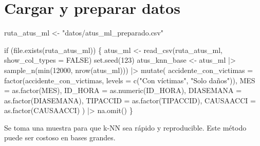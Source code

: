 \documentclass[
  spanish,
  11pt,
  letterpaper,
]{book}
\newenvironment{Shaded}{}{}
\newcommand{\AttributeTok}[1]{\textcolor[rgb]{0.84,0.23,0.29}{#1}}
\newcommand{\ConstantTok}[1]{\textcolor[rgb]{0.00,0.36,0.77}{#1}}
\newcommand{\ControlFlowTok}[1]{\textcolor[rgb]{0.84,0.23,0.29}{#1}}
\newcommand{\DecValTok}[1]{\textcolor[rgb]{0.00,0.36,0.77}{#1}}
\newcommand{\FunctionTok}[1]{\textcolor[rgb]{0.44,0.26,0.76}{#1}}
\newcommand{\NormalTok}[1]{\textcolor[rgb]{0.14,0.16,0.18}{#1}}
\newcommand{\OtherTok}[1]{\textcolor[rgb]{0.44,0.26,0.76}{#1}}
\newcommand{\SpecialCharTok}[1]{\textcolor[rgb]{0.00,0.36,0.77}{#1}}
\newcommand{\StringTok}[1]{\textcolor[rgb]{0.01,0.18,0.38}{#1}}
\begin{document}
\section{Cargar y preparar datos}\label{cargar-y-preparar-datos}

\begin{Shaded}
\begin{Highlighting}[]
\NormalTok{ruta\_atus\_ml }\OtherTok{\textless{}{-}} \StringTok{"datos/atus\_ml\_preparado.csv"}

\ControlFlowTok{if}\NormalTok{ (}\FunctionTok{file.exists}\NormalTok{(ruta\_atus\_ml)) \{}
\NormalTok{  atus\_ml }\OtherTok{\textless{}{-}} \FunctionTok{read\_csv}\NormalTok{(ruta\_atus\_ml, }\AttributeTok{show\_col\_types =} \ConstantTok{FALSE}\NormalTok{)}
  \FunctionTok{set.seed}\NormalTok{(}\DecValTok{123}\NormalTok{)}
\NormalTok{  atus\_knn\_base }\OtherTok{\textless{}{-}}\NormalTok{ atus\_ml }\SpecialCharTok{|\textgreater{}}
    \FunctionTok{sample\_n}\NormalTok{(}\FunctionTok{min}\NormalTok{(}\DecValTok{12000}\NormalTok{, }\FunctionTok{nrow}\NormalTok{(atus\_ml))) }\SpecialCharTok{|\textgreater{}}
    \FunctionTok{mutate}\NormalTok{(}
      \AttributeTok{accidente\_con\_victimas =} \FunctionTok{factor}\NormalTok{(accidente\_con\_victimas, }\AttributeTok{levels =} \FunctionTok{c}\NormalTok{(}\StringTok{"Con víctimas"}\NormalTok{, }\StringTok{"Solo daños"}\NormalTok{)),}
      \AttributeTok{MES =} \FunctionTok{as.factor}\NormalTok{(MES),}
      \AttributeTok{ID\_HORA =} \FunctionTok{as.numeric}\NormalTok{(ID\_HORA),}
      \AttributeTok{DIASEMANA =} \FunctionTok{as.factor}\NormalTok{(DIASEMANA),}
      \AttributeTok{TIPACCID =} \FunctionTok{as.factor}\NormalTok{(TIPACCID),}
      \AttributeTok{CAUSAACCI =} \FunctionTok{as.factor}\NormalTok{(CAUSAACCI)}
\NormalTok{    ) }\SpecialCharTok{|\textgreater{}}
    \FunctionTok{na.omit}\NormalTok{()}
\NormalTok{\}}
\end{Highlighting}
\end{Shaded}

\begin{tcolorbox}[enhanced jigsaw, arc=.35mm, bottomrule=.15mm, bottomtitle=1mm, breakable, colback=white, colbacktitle=quarto-callout-note-color!10!white, colframe=quarto-callout-note-color-frame, coltitle=black, left=2mm, leftrule=.75mm, opacityback=0, opacitybacktitle=0.6, rightrule=.15mm, title=\textcolor{quarto-callout-note-color}{\faInfo}\hspace{0.5em}{Explicación del código}, titlerule=0mm, toprule=.15mm, toptitle=1mm]

Se toma una muestra para que k-NN sea rápido y reproducible. Este método
puede ser costoso en bases grandes.

\end{tcolorbox}
\end{document}
